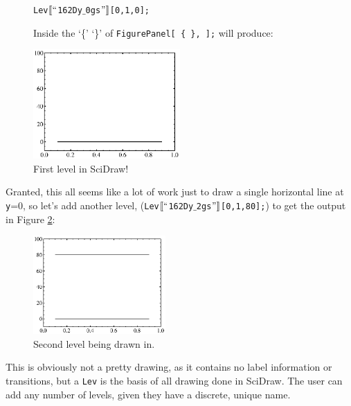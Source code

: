 \documentclass[portrait,10pt]{article}
\begin{document}
\begin{figure}[h!]
\begin{center}
{\tt Lev$\llbracket``$162Dy$\_$0gs$"\rrbracket$[0,1,0];}\\
\end{center}
Inside the `\{' `\}' of {\tt FigurePanel[ \{ \}, ];} will produce:\\
\begin{center}
\includegraphics[width=0.5\textwidth]{FirstLevel.eps}
\caption{First level in SciDraw! \label{text:FirstLevel}}
\end{center}
\end{figure}
\newpage
Granted, this all seems like a lot of work just to draw a single horizontal line at {\tt y}=0, so let's add another level, ({\tt Lev$\llbracket``$162Dy$\_$2gs$"\rrbracket$[0,1,80];}) to get the output in Figure \ref{text:SecondLevel}:
\begin{figure}[h]
\begin{center}
\includegraphics[width=0.45\textwidth]{SecondLevel.eps}
\end{center}
\caption{Second level being drawn in. \label{text:SecondLevel}}
\end{figure}

This is obviously not a pretty drawing, as it contains no label information or transitions, but a {\tt Lev} is the basis of all drawing done in SciDraw. The user can add any number of levels, given they have a discrete, unique name.
\end{document}
